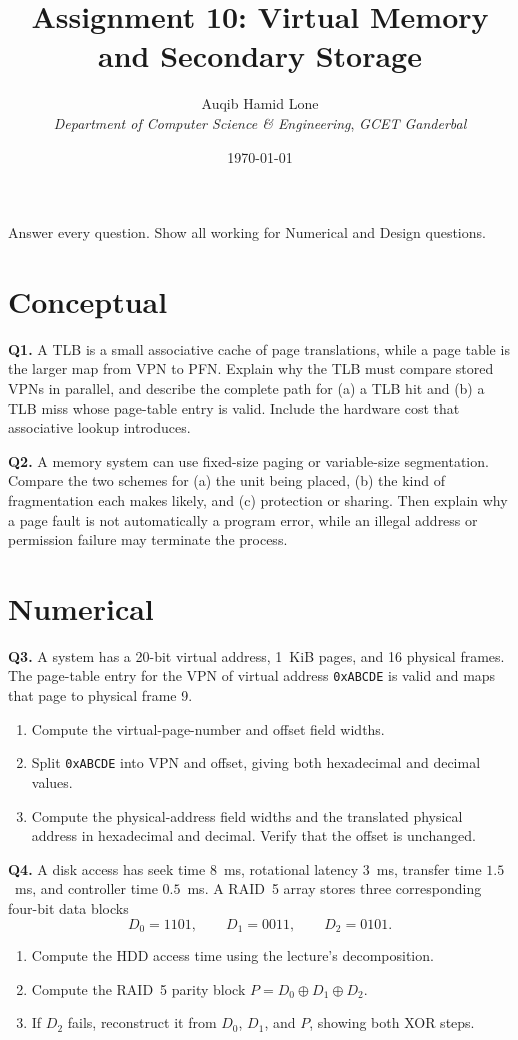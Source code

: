 \documentclass[11pt]{article}
\title{Assignment 10: Virtual Memory and Secondary Storage}
\author{Auqib Hamid Lone\\[0.3em]
  \emph{Department of Computer Science \& Engineering}, \emph{GCET Ganderbal}}
\date{\today}
\begin{document}
\maketitle

\noindent Answer every question. Show all working for Numerical and Design questions.

\section{Conceptual}

\textbf{Q1.} A TLB is a small associative cache of page translations, while a
page table is the larger map from VPN to PFN. Explain why the TLB must compare
stored VPNs in parallel, and describe the complete path for (a) a TLB hit and
(b) a TLB miss whose page-table entry is valid. Include the hardware cost that
associative lookup introduces.

\textbf{Q2.} A memory system can use fixed-size paging or variable-size
segmentation. Compare the two schemes for (a) the unit being placed, (b) the
kind of fragmentation each makes likely, and (c) protection or sharing. Then
explain why a page fault is not automatically a program error, while an illegal
address or permission failure may terminate the process.

\section{Numerical}

\textbf{Q3.} A system has a 20-bit virtual address, 1~KiB pages, and 16
physical frames. The page-table entry for the VPN of virtual address
\texttt{0xABCDE} is valid and maps that page to physical frame 9.
\begin{enumerate}
  \item[(a)] Compute the virtual-page-number and offset field widths.
  \item[(b)] Split \texttt{0xABCDE} into VPN and offset, giving both hexadecimal
        and decimal values.
  \item[(c)] Compute the physical-address field widths and the translated
        physical address in hexadecimal and decimal. Verify that the offset is
        unchanged.
\end{enumerate}

\textbf{Q4.} A disk access has seek time $8$~ms, rotational latency
$3$~ms, transfer time $1.5$~ms, and controller time $0.5$~ms. A RAID~5 array
stores three corresponding four-bit data blocks
\[
  D_0=1101,\qquad D_1=0011,\qquad D_2=0101.
\]
\begin{enumerate}
  \item[(a)] Compute the HDD access time using the lecture's decomposition.
  \item[(b)] Compute the RAID~5 parity block $P=D_0\mathbin{\oplus}D_1\mathbin{\oplus}D_2$.
  \item[(c)] If $D_2$ fails, reconstruct it from $D_0$, $D_1$, and $P$,
        showing both XOR steps.
\end{enumerate}
\end{document}
